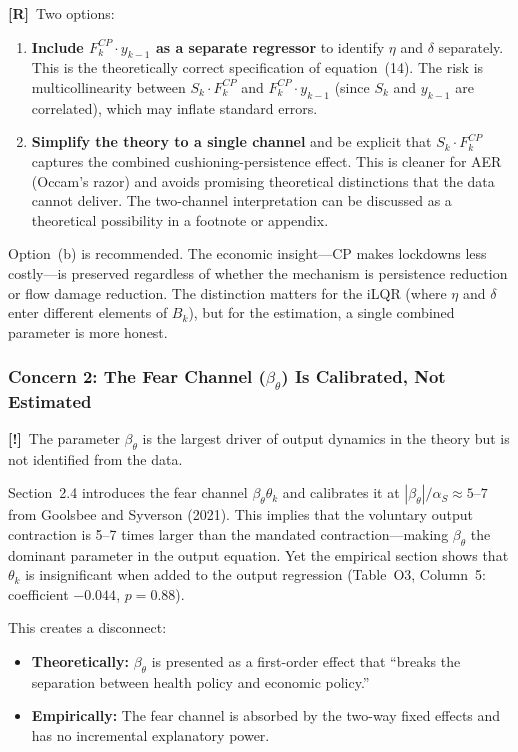 \documentclass[12pt, a4paper]{article}
\newcommand{\concern}[1]{\textcolor{concern}{\textbf{[!]}~#1}}
\newcommand{\recommend}[1]{\textcolor{recommend}{\textbf{[R]}~#1}}
\begin{document}
\recommend{Two options:}
\begin{enumerate}[label=(\alph*)]
    \item \textbf{Include $F_k^{CP} \cdot y_{k-1}$ as a separate regressor} to identify $\eta$ and $\delta$ separately. This is the theoretically correct specification of equation~(14). The risk is multicollinearity between $S_k \cdot F_k^{CP}$ and $F_k^{CP} \cdot y_{k-1}$ (since $S_k$ and $y_{k-1}$ are correlated), which may inflate standard errors.
    \item \textbf{Simplify the theory to a single channel} and be explicit that $S_k \cdot F_k^{CP}$ captures the combined cushioning-persistence effect. This is cleaner for AER (Occam's razor) and avoids promising theoretical distinctions that the data cannot deliver. The two-channel interpretation can be discussed as a theoretical possibility in a footnote or appendix.
\end{enumerate}
Option~(b) is recommended. The economic insight---CP makes lockdowns less costly---is preserved regardless of whether the mechanism is persistence reduction or flow damage reduction. The distinction matters for the iLQR (where $\eta$ and $\delta$ enter different elements of $B_k$), but for the estimation, a single combined parameter is more honest.


\subsubsection*{Concern 2: The Fear Channel ($\beta_\theta$) Is Calibrated, Not Estimated}

\concern{The parameter $\beta_\theta$ is the largest driver of output dynamics in the theory but is not identified from the data.}

Section~2.4 introduces the fear channel $\beta_\theta \theta_k$ and calibrates it at $|\beta_\theta|/\alpha_S \approx 5$--$7$ from Goolsbee and Syverson (2021). This implies that the voluntary output contraction is 5--7 times larger than the mandated contraction---making $\beta_\theta$ the dominant parameter in the output equation. Yet the empirical section shows that $\theta_k$ is insignificant when added to the output regression (Table~O3, Column~5: coefficient $-0.044$, $p = 0.88$).

This creates a disconnect:
\begin{itemize}
    \item \textbf{Theoretically:} $\beta_\theta$ is presented as a first-order effect that ``breaks the separation between health policy and economic policy.''
    \item \textbf{Empirically:} The fear channel is absorbed by the two-way fixed effects and has no incremental explanatory power.
\end{itemize}
\end{document}
